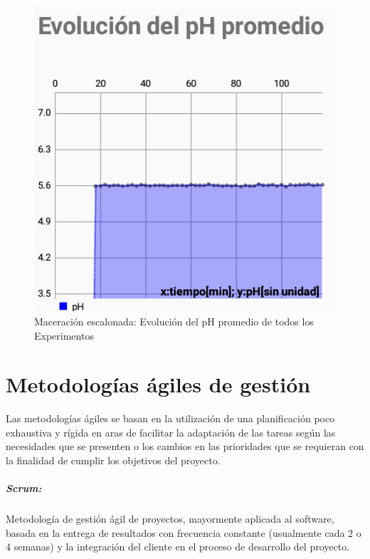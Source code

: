             \begin{figure}[H]
                \centering
                \includegraphics[scale=0.65]{Pruebas/EscalonadaEvolPhProm.jpg}
                \caption{Maceración escalonada: Evolución del pH promedio de todos los Experimentos}
                \label{fig:EscPhProm}
            \end{figure}     

\chapter{Metodologías ágiles de gestión}
\label{anexoMetodologiasAgiles}
\justifying
\par Las metodologías ágiles se basan en la utilización de una planificación poco exhaustiva y rígida en aras de facilitar la adaptación de las tareas según las necesidades que se presenten o los cambios en las prioridades que se requieran con la finalidad de cumplir los objetivos del proyecto.

\paragraph{Scrum:} Metodología de gestión ágil de proyectos, mayormente aplicada al software, basada en la  entrega de resultados con frecuencia constante (usualmente cada 2 o 4 semanas) y la integración del cliente en el proceso de desarrollo del proyecto.

